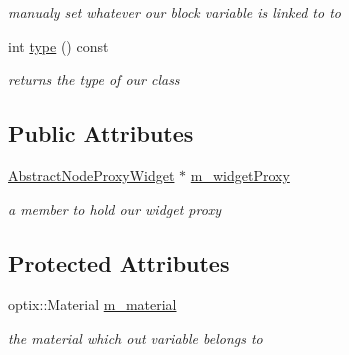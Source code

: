 \begin{DoxyCompactItemize}
\begin{DoxyCompactList}\small\item\em manualy set whatever our block variable is linked to to \end{DoxyCompactList}\item 
\hypertarget{class_o_s_l_abstract_var_block_adf69c1ae74b06326e7f868d0637e9b72}{int \hyperlink{class_o_s_l_abstract_var_block_adf69c1ae74b06326e7f868d0637e9b72}{type} () const }\label{class_o_s_l_abstract_var_block_adf69c1ae74b06326e7f868d0637e9b72}

\begin{DoxyCompactList}\small\item\em returns the type of our class \end{DoxyCompactList}\end{DoxyCompactItemize}
\subsection*{Public Attributes}
\begin{DoxyCompactItemize}
\item 
\hypertarget{class_o_s_l_abstract_var_block_a37602ac95b47ff0257b4a1f46799bb02}{\hyperlink{class_abstract_node_proxy_widget}{Abstract\-Node\-Proxy\-Widget} $\ast$ \hyperlink{class_o_s_l_abstract_var_block_a37602ac95b47ff0257b4a1f46799bb02}{m\-\_\-widget\-Proxy}}\label{class_o_s_l_abstract_var_block_a37602ac95b47ff0257b4a1f46799bb02}

\begin{DoxyCompactList}\small\item\em a member to hold our widget proxy \end{DoxyCompactList}\end{DoxyCompactItemize}
\subsection*{Protected Attributes}
\begin{DoxyCompactItemize}
\item 
\hypertarget{class_o_s_l_abstract_var_block_a913247d8558da16bbfe8fdd65f65dfce}{optix\-::\-Material \hyperlink{class_o_s_l_abstract_var_block_a913247d8558da16bbfe8fdd65f65dfce}{m\-\_\-material}}\label{class_o_s_l_abstract_var_block_a913247d8558da16bbfe8fdd65f65dfce}

\begin{DoxyCompactList}\small\item\em the material which out variable belongs to \end{DoxyCompactList}\end{DoxyCompactItemize}
